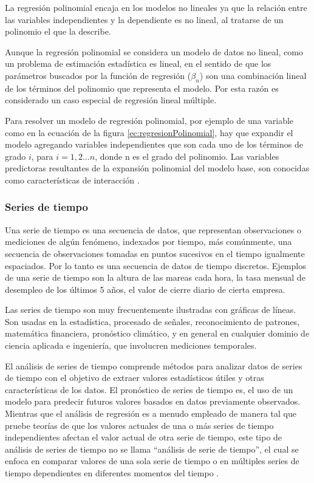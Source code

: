 La regresión polinomial encaja en los modelos no lineales ya que la relación entre las variables independientes y la dependiente es no lineal, al tratarse de un polinomio el que la describe.

Aunque la regresión polinomial se considera un modelo de datos no lineal, como un problema de estimación estadística es lineal, en el sentido de que los parámetros buscados por la función de regresión ($\beta_n$) son una combinación lineal de los términos del polinomio que representa el modelo. Por esta razón es considerado un caso especial de regresión lineal múltiple.

Para resolver un modelo de regresión polinomial, por ejemplo de una variable como en la ecuación de la figura \ref{ec:regresionPolinomial}, hay que expandir el modelo agregando variables independientes que son cada uno de los términos de grado $i$, para $i=1,2... n$, donde n es el grado del polinomio.
Las variables predictoras resultantes de la expansión polinomial del modelo base, son conocidas como características de interacción \cite{YWChangCJHsiehKWChangTrainingAndTesting}.

\subsubsection{Series de tiempo}
Una serie de tiempo es una secuencia de datos, que representan observaciones o mediciones de algún fenómeno, indexados por tiempo, más comúnmente, una secuencia de observaciones tomadas en puntos sucesivos en el tiempo igualmente espaciados. Por lo tanto es una secuencia de datos de tiempo discretos. 
Ejemplos de una serie de tiempo son la altura de las mareas cada hora, la tasa mensual de desempleo de los últimos 5 años, el valor de cierre diario de cierta empresa.

Las series de tiempo son muy frecuentemente ilustradas con gráficas de líneas. 
Son usadas en la estadística, procesado de señales, reconocimiento de patrones, matemática financiera, pronóstico climático, y en general en cualquier dominio de ciencia aplicada e ingeniería, que involucren mediciones temporales.

El análisis de series de tiempo comprende métodos para analizar datos de series de tiempo con el objetivo de extraer valores estadísticos útiles y otras características de los datos. 
El pronóstico de series de tiempo es, el uso de un modelo para predecir futuros valores basados en datos previamente observados. 
Mientras que el análisis de regresión es a menudo empleado de manera tal que pruebe teorías de que los valores actuales de una o más series de tiempo independientes afectan el valor actual de otra serie de tiempo, este tipo de análisis de series de tiempo no se llama
``análisis de serie de tiempo'', el cual se enfoca en comparar valores de una sola serie de tiempo o en múltiples series de tiempo dependientes en diferentes momentos del tiempo \cite{MImdadullahTimeSeriesAnalysis}.

